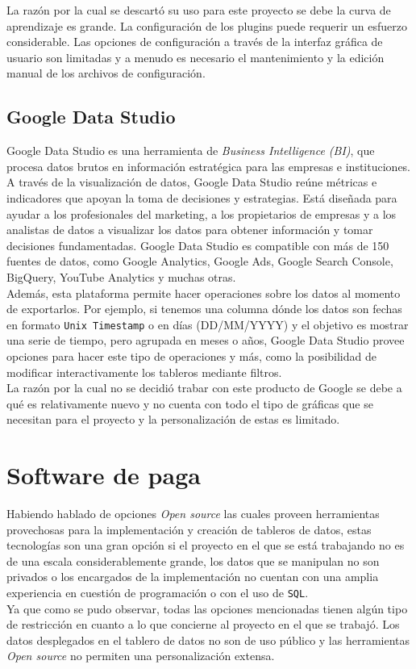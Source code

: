 La razón por la cual se descartó su uso para este proyecto se debe la curva de aprendizaje es grande. La configuración de los plugins puede requerir un esfuerzo considerable. Las opciones de configuración a través de la interfaz gráfica de usuario son limitadas y a menudo es necesario el mantenimiento y la edición manual de los archivos de configuración.


\subsection{Google Data Studio}
Google Data Studio es una herramienta de \textit{Business Intelligence (BI)}, que procesa datos brutos en información estratégica para las empresas e instituciones. A través de la visualización de datos, Google Data Studio reúne métricas e indicadores que apoyan la toma de decisiones y estrategias. Está diseñada para ayudar a los profesionales del marketing, a los propietarios de empresas y a los analistas de datos a visualizar los datos para obtener información y tomar decisiones fundamentadas. Google Data Studio es compatible con más de 150 fuentes de datos, como Google Analytics, Google Ads, Google Search Console, BigQuery, YouTube Analytics y muchas otras.\\
Además, esta plataforma permite hacer operaciones sobre los datos al momento de exportarlos. Por ejemplo, si tenemos una columna dónde los datos son fechas en formato \texttt{Unix Timestamp} o en días (DD/MM/YYYY) y el objetivo es mostrar una serie de tiempo, pero agrupada en meses o años, Google Data Studio provee opciones para hacer este tipo de operaciones y más, como la posibilidad de modificar interactivamente los tableros mediante filtros.\\

La razón por la cual no se decidió trabar con este producto de Google se debe a qué es relativamente nuevo y no cuenta con todo el tipo de gráficas que se necesitan para el proyecto y la personalización de estas es limitado.


\section{Software de paga}
Habiendo hablado de opciones \textit{Open source} las cuales proveen herramientas provechosas para la implementación y creación de tableros de datos, estas tecnologías son una gran opción si el proyecto en el que se está trabajando no es de una escala considerablemente grande, los datos que se manipulan no son privados o los encargados de la implementación no cuentan con una amplia experiencia en cuestión de programación o con el uso de \texttt{SQL}.\\
Ya que como se pudo observar, todas las opciones mencionadas tienen algún tipo de restricción en cuanto a lo que concierne al proyecto en el que se trabajó. Los datos desplegados en el tablero de datos no son de uso público y las herramientas \textit{Open source} no permiten una personalización extensa.\\

